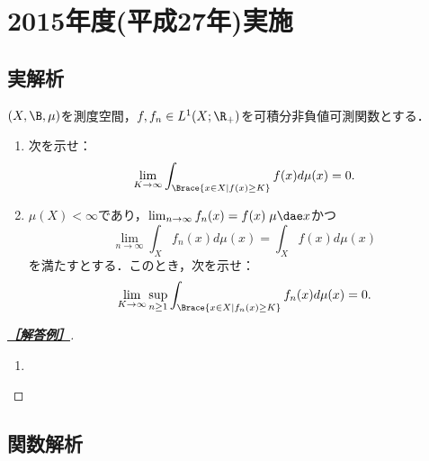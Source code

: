 \documentclass[uplatex,dvipdfmx]{jsarticle}
\begin{document}
\section{2015年度(平成27年)実施}

\subsection{実解析}

\begin{tcolorbox}[colframe=ForestGreen, colback=ForestGreen!10!white,breakable,colbacktitle=ForestGreen!40!white,coltitle=black,fonttitle=\bfseries\sffamily,
    title=B 第11問（実解析）]
    $(X,\B,\mu)$を測度空間，$f,f_n\in L^1(X;\R_+)$を可積分非負値可測関数とする．
    \begin{enumerate}
        \item 次を示せ：
        \[\lim_{K\to\infty}\int_{\Brace{x\in X\mid f(x)\ge K}}f(x)d\mu(x)=0.\]
        \item $\mu(X)<\infty$であり，$\lim_{n\to\infty}f_n(x)=f(x)\;\mu\dae x$かつ
        \[\lim_{n\to\infty}\int_Xf_n(x)d\mu(x)=\int_Xf(x)d\mu(x)\]
        を満たすとする．このとき，次を示せ：
        \[\lim_{K\to\infty}\sup_{n\ge1}\int_{\Brace{x\in X\mid f_n(x)\ge K}}f_n(x)d\mu(x)=0.\]
    \end{enumerate}
\end{tcolorbox}
\begin{proof}[\textbf{\underline{［解答例］}}]\mbox{}
    \begin{enumerate}
        \item 
    \end{enumerate}
\end{proof}

\subsection{関数解析}
\end{document}
